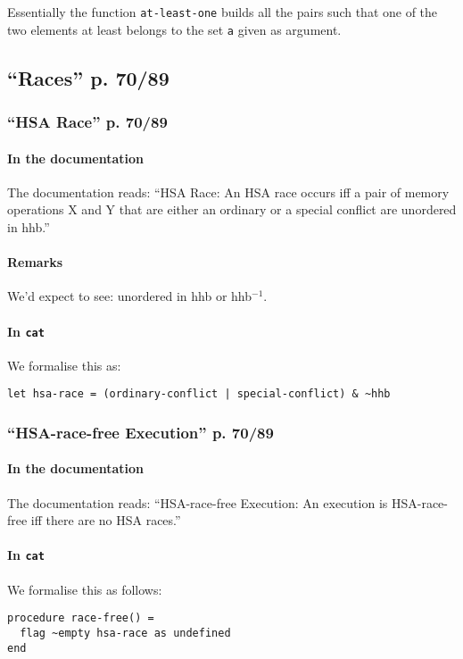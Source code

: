 \documentclass[a4paper]{article}
\begin{document}
Essentially the function {\tt at-least-one} builds all the pairs such that one
of the two elements at least belongs to the set {\tt a} given as argument.

\subsection{``Races'' p. 70/89 \label{sec:races}}

\subsubsection{``HSA Race'' p. 70/89}
\paragraph{In the documentation}
The documentation reads: ``HSA Race: An HSA race occurs iff a pair of memory
operations X and Y that are either an ordinary or a special conflict are
unordered in hhb.'' 

\paragraph{Remarks}
We'd expect to see: unordered in hhb or hhb$^{-1}$.

\paragraph{In {\tt cat}}
We formalise this as:
\begin{verbatim}
let hsa-race = (ordinary-conflict | special-conflict) & ~hhb
\end{verbatim} 

\subsubsection{``HSA-race-free Execution'' p. 70/89}

\paragraph{In the documentation}
The documentation reads: ``HSA-race-free Execution: An execution is
HSA-race-free iff there are no HSA races.''

\paragraph{In {\tt cat}}
We formalise this as follows:
\begin{verbatim}
procedure race-free() =
  flag ~empty hsa-race as undefined
end
\end{verbatim} 
\end{document}
